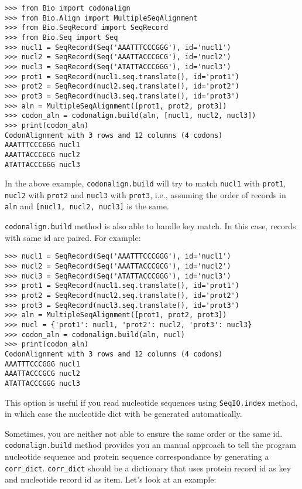 \documentclass{article}
\begin{document}
\begin{verbatim}
>>> from Bio import codonalign
>>> from Bio.Align import MultipleSeqAlignment
>>> from Bio.SeqRecord import SeqRecord
>>> from Bio.Seq import Seq
>>> nucl1 = SeqRecord(Seq('AAATTTCCCGGG'), id='nucl1')
>>> nucl2 = SeqRecord(Seq('AAATTACCCGCG'), id='nucl2')
>>> nucl3 = SeqRecord(Seq('ATATTACCCGGG'), id='nucl3')
>>> prot1 = SeqRecord(nucl1.seq.translate(), id='prot1')
>>> prot2 = SeqRecord(nucl2.seq.translate(), id='prot2')
>>> prot3 = SeqRecord(nucl3.seq.translate(), id='prot3')
>>> aln = MultipleSeqAlignment([prot1, prot2, prot3])
>>> codon_aln = codonalign.build(aln, [nucl1, nucl2, nucl3])
>>> print(codon_aln)
CodonAlignment with 3 rows and 12 columns (4 codons)
AAATTTCCCGGG nucl1
AAATTACCCGCG nucl2
ATATTACCCGGG nucl3
\end{verbatim}

In the above example, \texttt{codonalign.build} will try to match
\texttt{nucl1} with \texttt{prot1}, \texttt{nucl2} with \texttt{prot2}
and \texttt{nucl3} with \texttt{prot3}, i.e., assuming the order of
records in \texttt{aln} and \texttt{{[}nucl1, nucl2, nucl3{]}} is the
same.

\texttt{codonalign.build} method is also able to handle key match. In
this case, records with same id are paired. For example:

\begin{verbatim}
>>> nucl1 = SeqRecord(Seq('AAATTTCCCGGG'), id='nucl1')
>>> nucl2 = SeqRecord(Seq('AAATTACCCGCG'), id='nucl2')
>>> nucl3 = SeqRecord(Seq('ATATTACCCGGG'), id='nucl3')
>>> prot1 = SeqRecord(nucl1.seq.translate(), id='prot1')
>>> prot2 = SeqRecord(nucl2.seq.translate(), id='prot2')
>>> prot3 = SeqRecord(nucl3.seq.translate(), id='prot3')
>>> aln = MultipleSeqAlignment([prot1, prot2, prot3])
>>> nucl = {'prot1': nucl1, 'prot2': nucl2, 'prot3': nucl3}
>>> codon_aln = codonalign.build(aln, nucl)
>>> print(codon_aln)
CodonAlignment with 3 rows and 12 columns (4 codons)
AAATTTCCCGGG nucl1
AAATTACCCGCG nucl2
ATATTACCCGGG nucl3
\end{verbatim}

This option is useful if you read nucleotide sequences using
\texttt{SeqIO.index} method, in which case the nucleotide dict with be
generated automatically.

Sometimes, you are neither not able to ensure the same order or the same
id. \texttt{codonalign.build} method provides you an manual approach to
tell the program nucleotide sequence and protein sequence correspondance
by generating a \texttt{corr\_dict}. \texttt{corr\_dict} should be a
dictionary that uses protein record id as key and nucleotide record id
as item. Let's look at an example:
\end{document}
